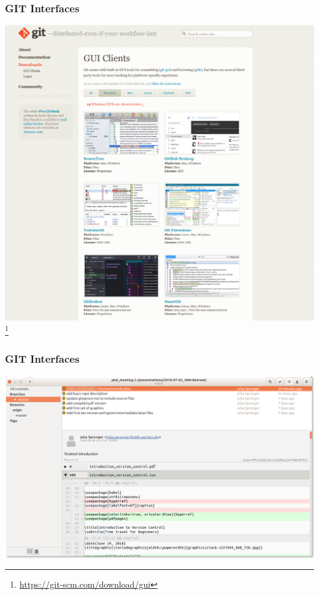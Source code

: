 \documentclass[
t, %
10pt, %
aspectratio=1610, %
ngerman,
english,
]{beamer}
\newcommand\blfootnote[1]{%
  \begingroup
  \renewcommand\thefootnote{}\footnote{#1}%
  \addtocounter{footnote}{-1}%
  \endgroup
}
\begin{document}
\begin{frame}
    \frametitle{GIT Interfaces}
    \centering
    \includegraphics[height=0.8\textheight]{graphics/Screenshot_GUI_Clients.png}\\
    \blfootnote{\url{https://git-scm.com/download/gui}}
\end{frame}

\begin{frame}
    \frametitle{GIT Interfaces}
    \centering
    \includegraphics[height=0.8\textheight]{graphics/Screenshot_gitg.png}\\
\end{frame}
\end{document}
